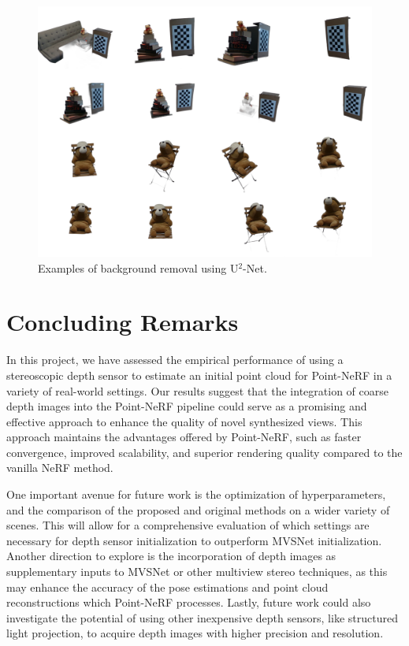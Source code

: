 \documentclass[10pt,twocolumn,letterpaper]{article}
\begin{document}
\begin{figure}[h]
  \centering
  \includegraphics[width=\linewidth]{images/sample.png}
  \caption{Examples of background removal using U$^2$-Net.}
   \label{fig:sample}
\end{figure}


\section{Concluding Remarks}
In this project, we have assessed the empirical performance of using a stereoscopic depth sensor to estimate an initial point cloud for Point-NeRF in a variety of real-world settings. Our results suggest that the integration of coarse depth images into the Point-NeRF pipeline could serve as a promising and effective approach to enhance the quality of novel synthesized views. This approach maintains the advantages offered by Point-NeRF, such as faster convergence, improved scalability, and superior rendering quality compared to the vanilla NeRF method.

One important avenue for future work is the optimization of hyperparameters, and the comparison of the proposed and original methods on a wider variety of scenes. This will allow for a comprehensive evaluation of which settings are necessary for depth sensor initialization to outperform MVSNet initialization. Another direction to explore is the incorporation of depth images as supplementary inputs to MVSNet or other multiview stereo techniques, as this may enhance the accuracy of the pose estimations and point cloud reconstructions which Point-NeRF processes. Lastly, future work could also investigate the potential of using other inexpensive depth sensors, like structured light projection, to acquire depth images with higher precision and resolution.
\end{document}
